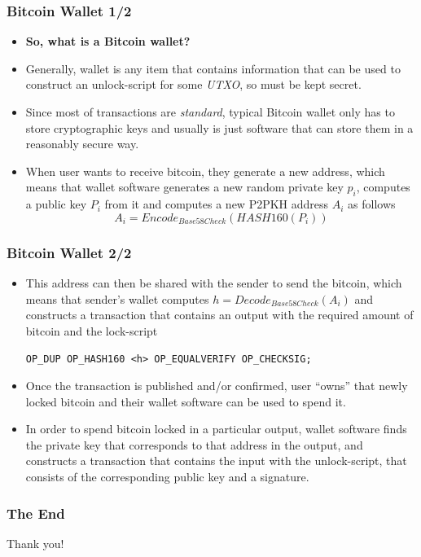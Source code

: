\documentclass{beamer}
\begin{document}
\begin{frame}[fragile]
  \frametitle{Bitcoin Wallet 1/2}
  \begin{itemize}
  \item \textbf{So, what is a Bitcoin wallet?}
  \item Generally, wallet is any item that contains information that can be used
    to construct an unlock-script for some \textit{UTXO}, so must be kept secret.
  \item Since most of transactions are \textit{standard}, typical Bitcoin wallet
    only has to store cryptographic keys and usually is just software that can
    store them in a reasonably secure way.
  \item When user wants to receive bitcoin, they generate a new address, which
    means that wallet software generates a new random private key $p_i$, computes a
    public key $P_i$ from it and computes a new P2PKH address $A_i$ as follows
    $$A_i = Encode_{Base58Check}(HASH160(P_i))$$
  \end{itemize}
\end{frame}

\begin{frame}[fragile]
  \frametitle{Bitcoin Wallet 2/2}
  \begin{itemize}
  \item This address can then be shared with the sender to send the bitcoin,
    which means that sender's wallet computes $h = Decode_{Base58Check}(A_i)$
    and constructs a transaction that contains an output with the required
    amount of bitcoin and the lock-script
    \begin{center}
      \tiny\texttt{OP_DUP OP_HASH160 <h> OP_EQUALVERIFY OP_CHECKSIG;}
    \end{center}
  \item Once the transaction is published and/or confirmed, user ``owns'' that
    newly locked bitcoin and their wallet software can be used to spend it.
  \item In order to spend bitcoin locked in a particular output, wallet software
    finds the private key that corresponds to that address in the output, and
    constructs a transaction that contains the input with the unlock-script,
    that consists of the corresponding public key and a signature.
  \end{itemize}
\end{frame}

\begin{frame}
  \frametitle{The End}
  \begin{center}
    Thank you!
  \end{center}
\end{frame}
\end{document}
